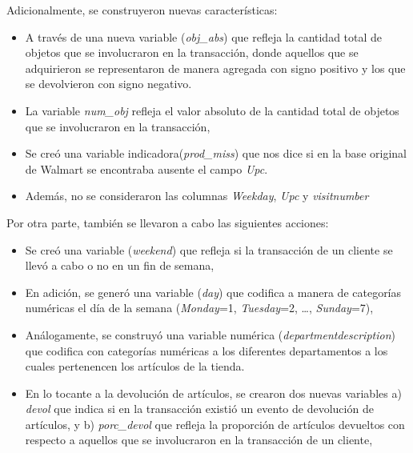 \documentclass[]{book}
\providecommand{\tightlist}{%
  \setlength{\itemsep}{0pt}\setlength{\parskip}{0pt}}
\begin{document}
Adicionalmente, se construyeron nuevas características:

\begin{itemize}
\tightlist
\item
  A través de una nueva variable (\emph{obj\_abs}) que refleja la cantidad total de objetos que se involucraron en la transacción, donde aquellos que se adquirieron se representaron de manera agregada con signo positivo y los que se devolvieron con signo negativo.
\item
  La variable \emph{num\_obj} refleja el valor absoluto de la cantidad total de objetos que se involucraron en la transacción,
\item
  Se creó una variable indicadora(\emph{prod\_miss}) que nos dice si en la base original de Walmart se encontraba ausente el campo \emph{Upc}.
\item
  Además, no se consideraron las columnas \emph{Weekday}, \emph{Upc} y \emph{visitnumber}
\end{itemize}

Por otra parte, también se llevaron a cabo las siguientes acciones:

\begin{itemize}
\tightlist
\item
  Se creó una variable (\emph{weekend}) que refleja si la transacción de un cliente se llevó a cabo o no en un fin de semana,
\item
  En adición, se generó una variable (\emph{day}) que codifica a manera de categorías numéricas el día de la semana (\emph{Monday}=1, \emph{Tuesday}=2, \ldots{}, \emph{Sunday}=7),
\item
  Análogamente, se construyó una variable numérica (\emph{departmentdescription}) que codifica con categorías numéricas a los diferentes departamentos a los cuales pertenencen los artículos de la tienda.
\item
  En lo tocante a la devolución de artículos, se crearon dos nuevas variables a) \emph{devol} que indica si en la transacción existió un evento de devolución de artículos, y b) \emph{porc\_devol} que refleja la proporción de artículos devueltos con respecto a aquellos que se involucraron en la transacción de un cliente,
\end{itemize}


\end{document}

